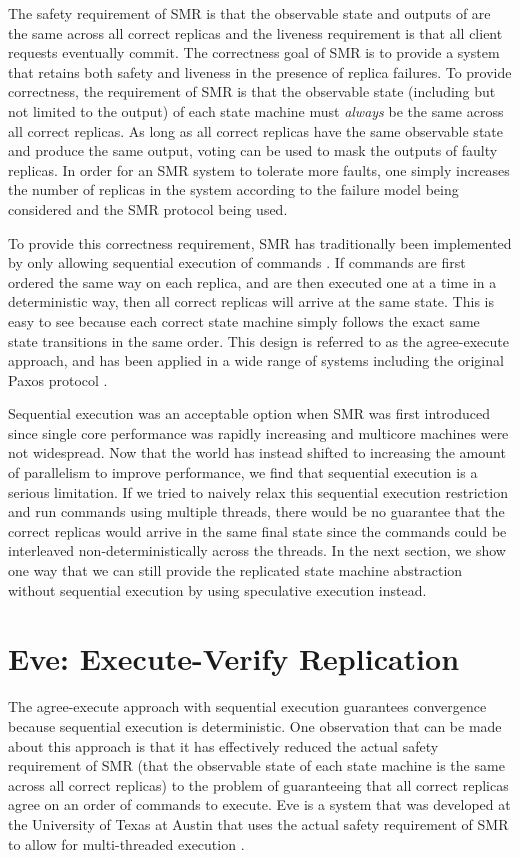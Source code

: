 \documentclass[11pt, oneside]{report}
\begin{document}
The safety requirement of SMR is that the observable state and outputs of are the same across all correct replicas and the liveness requirement is that all client requests eventually commit.
The correctness goal of SMR is to provide a system that retains both safety and liveness in the presence of replica failures. 
To provide correctness, the requirement of SMR is that the observable state (including but not limited to the output) of each state machine must \emph{always} be the same across all correct replicas. 
As long as all correct replicas have the same observable state and produce the same output, voting can be used to mask the outputs of faulty replicas. 
In order for an SMR system to tolerate more faults, one simply increases the number of replicas in the system according to the failure model being considered and the SMR protocol being used.

To provide this correctness requirement, SMR has traditionally been implemented by only allowing sequential execution of commands \cite{paxos, paxosMadeSimple, schneider}.
If commands are first ordered the same way on each replica, and are then executed one at a time in a deterministic way, then all correct replicas will arrive at the same state. 
This is easy to see because each correct state machine simply follows the exact same state transitions in the same order. 
This design is referred to as the agree-execute approach, and has been applied in a wide range of systems including the original Paxos protocol \cite{paxos}.

Sequential execution was an acceptable option when SMR was first introduced since single core performance was rapidly increasing and multicore machines were not widespread. 
Now that the world has instead shifted to increasing the amount of parallelism to improve performance, we find that sequential execution is a serious limitation. 
If we tried to naively relax this sequential execution restriction and run commands using multiple threads, there would be no guarantee that the correct replicas would arrive in the same final state since the commands could be interleaved non-deterministically across the threads. 
In the next section, we show one way that we can still provide the replicated state machine abstraction without sequential execution by using speculative execution instead. 
 

\section{Eve: Execute-Verify Replication}
The agree-execute approach with sequential execution guarantees convergence because sequential execution is deterministic. 
One observation that can be made about this approach is that it has effectively reduced the actual safety requirement of SMR (that the observable state of each state machine is the same across all correct replicas) to the problem of guaranteeing that all correct replicas agree on an order of commands to execute.
Eve is a system that was developed at the University of Texas at Austin that uses the actual safety requirement of SMR to allow for multi-threaded execution \cite{manosThesis, eve}.
\end{document}
